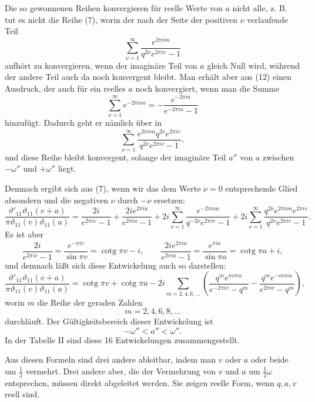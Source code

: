 \documentclass[11pt]{article}
\providecommand{\tht}{\vartheta}
\providecommand{\cotg}{\operatorname{cotg}}
\begin{document}
Die so gewonnenen Reihen konvergieren für reelle Werte von $a$ nicht alle, z. B. tut es nicht die Reihe (7), worin der nach der Seite der positiven $\nu$ verlaufende Teil
\begin{equation}
\sum_{\nu=1}^{\infty}\frac{e^{2\pi i\nu a}}{q^{2\nu}e^{2\pi iv}-1}
\tag{12}
\end{equation}
aufhört zu konvergieren, wenn der imaginäre Teil von $a$ gleich Null wird, während der andere Teil auch da noch konvergent bleibt. Man erhält aber aus (12) einen Ausdruck, der auch für ein reelles $a$ noch konvergiert, wenn man die Summe
\begin{equation}
\sum_{\nu=1}^{\infty}e^{-2\pi i\nu a}=-\frac{e^{-2\pi ia}}{e^{-2\pi ia}-1}
\tag{13}
\end{equation}
hinzufügt. Dadurch geht er nämlich über in
\[
\sum_{\nu=1}^{\infty}\frac{e^{2\pi i\nu a}q^{2\nu}e^{2\pi iv}}{q^{2\nu}e^{2\pi iv}-1},
\]
und diese Reihe bleibt konvergent, solange der imaginäre Teil $a''$ von $a$ zwischen $-\omega''$ und $+\omega''$ liegt.

Demnach ergibt sich aus (7), wenn wir das dem Werte $\nu=0$ entsprechende Glied absondern und die negativen $\nu$ durch $-\nu$ ersetzen:
\[
\frac{\tht'_{11}\tht_{11}(v+a)}{\pi\tht_{11}(v)\tht_{11}(a)}
=\frac{2i}{e^{2\pi iv}-1}+\frac{2ie^{2\pi ia}}{e^{2\pi ia}-1}
+2i\sum_{\nu=1}^{\infty}\frac{e^{-2\pi i\nu a}}{q^{-2\nu}e^{2\pi iv}-1}
+2i\sum_{\nu=1}^{\infty}\frac{q^{2\nu}e^{2\pi i\nu a}e^{2\pi iv}}{q^{2\nu}e^{2\pi iv}-1}.
\]
Es ist aber
\[
\frac{2i}{e^{2\pi iv}-1}=\frac{e^{-\pi iv}}{\sin\pi v}=\cotg\pi v-i,
\qquad
\frac{2ie^{2\pi ia}}{e^{2\pi ia}-1}=\frac{e^{\pi ia}}{\sin\pi a}=\cotg\pi a+i,
\]
und demnach läßt sich diese Entwickelung auch so darstellen:
\begin{equation}
\frac{\tht'_{11}\tht_{11}(v+a)}{\pi\tht_{11}(v)\tht_{11}(a)}
=\cotg\pi v+\cotg\pi a
-2i\sum_{m=2,4,6,\ldots}\left(
\frac{q^m e^{m\pi ia}}{e^{-2\pi iv}-q^m}
-\frac{q^m e^{-m\pi ia}}{e^{2\pi iv}-q^m}
\right),
\tag{14}
\end{equation}
worin $m$ die Reihe der geraden Zahlen
\[
m=2,4,6,8,\ldots
\]
durchläuft. Der Gültigkeitsbereich dieser Entwickelung ist
\[
-\omega''<a''<\omega''.
\]
In der Tabelle II sind diese 16 Entwickelungen zusammengestellt.

Aus diesen Formeln sind drei andere ableitbar, indem man $v$ oder $a$ oder beide um $\frac12$ vermehrt. Drei andere aber, die der Vermehrung von $v$ und $a$ um $\frac12\omega$ entsprechen, müssen direkt abgeleitet werden. Sie zeigen reelle Form, wenn $q,a,v$ reell sind.
\end{document}
